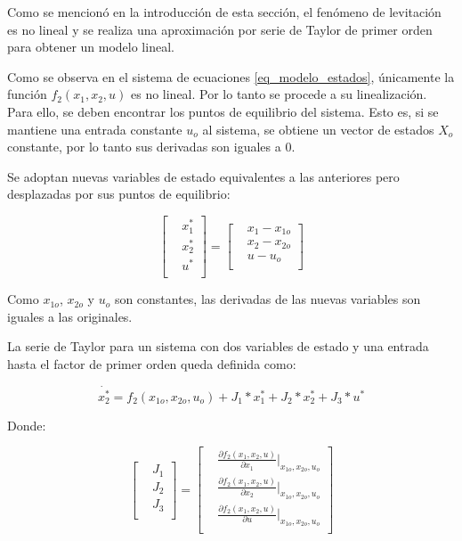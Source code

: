 Como se mencionó en la introducción de esta sección, el fenómeno de levitación es no lineal y se realiza una aproximación por serie de Taylor de primer orden para obtener un modelo lineal. 

Como se observa en el sistema de ecuaciones \ref{eq_modelo_estados}, únicamente la función $f_2(x_1,x_2,u)$ es no lineal. Por lo tanto se procede a su linealización. Para ello, se deben encontrar los puntos de equilibrio del sistema. Esto es, si se mantiene una entrada constante $u_o$ al sistema, se obtiene un vector de estados $X_o$ constante, por lo tanto sus derivadas son iguales a 0.

Se adoptan nuevas variables de estado equivalentes a las anteriores pero desplazadas por sus puntos de equilibrio:


\begin{equation*}
	\begin{bmatrix}
		&x_1^*\\
		&x_2^*\\
		&u^*\\
	\end{bmatrix}
	=
	\begin{bmatrix}
		&x_1-x_{1o}\\
		&x_2-x_{2o}\\
		&u-u_o\\
	\end{bmatrix}
\end{equation*}

Como $x_{1o}$, $x_{2o}$ y $u_o$ son constantes, las derivadas de las nuevas variables son iguales a las originales.

La serie de Taylor para un sistema con dos variables de estado y una entrada hasta el factor de primer orden queda definida como:

\begin{equation} \label{eq_taylor}
	\dot{x_{2}^*}=f_2(x_{1o}, x_{2o}, u_{o})+J_1*x_1^*+J_2*x_2^*+J_3*u^*
\end{equation}

Donde:

\begin{equation} \label{eq_jacobianos}
	\begin{bmatrix} %
		&{J_{1}}\\
		&{J_{2}}\\
		&{J_{3}}\\
	\end{bmatrix}
	=
	\begin{bmatrix} %
		&\frac{\partial{f_2(x_1,x_2,u)}}{\partial{x_1}}\Biggr|_{x_{1o},x_{2o},u_o}\\
		&\frac{\partial{f_2(x_1,x_2,u)}}{\partial{x_2}}\Biggr|_{x_{1o},x_{2o},u_o}\\
		&\frac{\partial{f_2(x_1,x_2,u)}}{\partial{u}}\Biggr|_{x_{1o},x_{2o},u_o}\\
	\end{bmatrix}
\end{equation}

